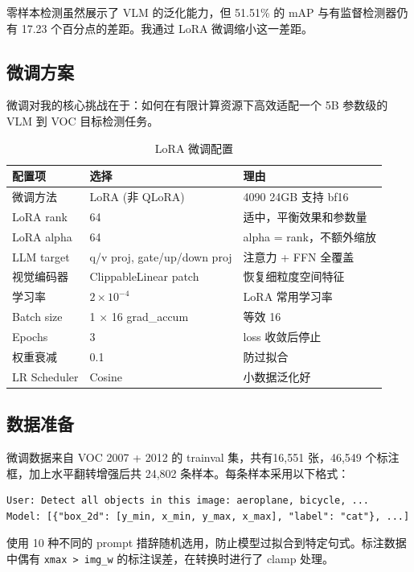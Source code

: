 \documentclass[12pt, a4paper]{article}
\begin{document}
零样本检测虽然展示了 VLM 的泛化能力，但 51.51\% 的 mAP 与有监督检测器仍有 17.23 个百分点的差距。我通过 LoRA 微调缩小这一差距。

\subsection{微调方案}

微调对我的核心挑战在于：如何在有限计算资源下高效适配一个 5B 参数级的 VLM 到 VOC 目标检测任务。

\begin{table}[H]
\centering
\caption{LoRA 微调配置}
\label{tab:lora_config}
\begin{tabular}{@{}lll@{}}
\toprule
\textbf{配置项} & \textbf{选择} & \textbf{理由} \\
\midrule
微调方法 & LoRA (非 QLoRA) & 4090 24GB 支持 bf16 \\
LoRA rank & 64 & 适中，平衡效果和参数量 \\
LoRA alpha & 64 & alpha = rank，不额外缩放 \\
LLM target & q/v proj, gate/up/down proj & 注意力 + FFN 全覆盖 \\
视觉编码器 & ClippableLinear patch & 恢复细粒度空间特征 \\
学习率 & $2 \times 10^{-4}$ & LoRA 常用学习率 \\
Batch size & 1 $\times$ 16 grad\_accum & 等效 16 \\
Epochs & 3 & loss 收敛后停止 \\
权重衰减 & 0.1 & 防过拟合 \\
LR Scheduler & Cosine & 小数据泛化好 \\
\bottomrule
\end{tabular}
\end{table}

\subsection{数据准备}

微调数据来自 VOC 2007 + 2012 的 trainval 集，共有16,551 张，46,549 个标注框，加上水平翻转增强后共 24,802 条样本。每条样本采用以下格式：

\begin{verbatim}
User: Detect all objects in this image: aeroplane, bicycle, ...
Model: [{"box_2d": [y_min, x_min, y_max, x_max], "label": "cat"}, ...]
\end{verbatim}

使用 10 种不同的 prompt 措辞随机选用，防止模型过拟合到特定句式。标注数据中偶有 \texttt{xmax > img\_w} 的标注误差，在转换时进行了 clamp 处理。
\end{document}
